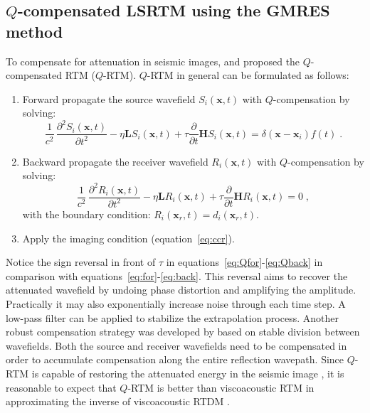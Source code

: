 \subsection{$Q$-compensated LSRTM using the GMRES method}

To compensate for attenuation in seismic images, \cite{zhu14b} and \cite{me15a} proposed the $Q$-compensated RTM ($Q$-RTM). $Q$-RTM in general can be formulated as follows:
\begin{enumerate}
  \item Forward propagate the source wavefield $S_i(\mathbf{x},t)$ with $Q$-compensation by solving:
  \begin{equation}
      {\frac{1}{c^2}}\,{\frac{\partial^2 S_i(\mathbf{x},t)}{\partial t^2}} - \eta \mathbf{L} S_i(\mathbf{x},t) + \tau \frac{\partial}{\partial t}\mathbf{H} S_i(\mathbf{x},t) = \delta(\mathbf{x}-\mathbf{x}_i) f(t) \; .
  \label{eq:Qfor}
  \end{equation}
  \item Backward propagate the receiver wavefield $R_i(\mathbf{x},t)$ with $Q$-compensation by solving:
  \begin{equation}
      {\frac{1}{c^2}}\,{\frac{\partial^2 R_i(\mathbf{x},t)}{\partial t^2}} - \eta \mathbf{L} R_i(\mathbf{x},t) + \tau \frac{\partial}{\partial t} \mathbf{H} R_i(\mathbf{x},t) = 0 \;,
  \label{eq:Qback}
  \end{equation}
  with the boundary condition: $R_i(\mathbf{x}_r,t) = d_i(\mathbf{x}_r,t)$.
  \item Apply the imaging condition (equation~\ref{eq:ccr}).
\end{enumerate}
Notice the sign reversal in front of $\tau$ in equations~\ref{eq:Qfor}-\ref{eq:Qback} in comparison with equations~\ref{eq:for}-\ref{eq:back}. This reversal aims to recover the attenuated wavefield by undoing phase distortion and amplifying the amplitude. Practically it may also exponentially increase noise through each time step. A low-pass filter can be applied to stabilize the extrapolation process. Another robust compensation strategy was developed by \cite{me15c} based on stable division between wavefields. Both the source and receiver wavefields need to be compensated in order to accumulate compensation along the entire reflection wavepath. Since $Q$-RTM is capable of restoring the attenuated energy in the seismic image \cite[]{zhu14b,me15a}, it is reasonable to expect that $Q$-RTM is better than viscoacoustic RTM in approximating the inverse of viscoacoustic RTDM .

